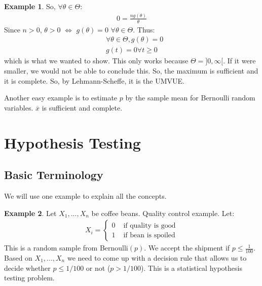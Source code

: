 \documentclass[11pt]{scrartcl}
\theoremstyle{definition}
\newtheorem{ex}{Example}
\theoremstyle{remark}
\begin{document}
{\begin{ex}
	So, $\forall \theta \in \Theta$: 
	\begin{align*}
		0 = \frac{n g(\theta)}{\theta}
	\end{align*}
	Since $n > 0$, $\theta > 0$ $\iff$ $g(\theta) = 0$ $\forall \theta \in \Theta$. Thus: 
	\begin{align*}
		& \forall \theta \in \Theta, g(\theta) = 0 \\
		& g(t) = 0 \forall t \geq 0
	\end{align*}
	which is what we wanted to show. This only works because $\Theta = ]0, \infty[$. If it were smaller, we would not be able to conclude this. So, the maximum is sufficient and it is complete. So, by Lehmann-Scheffe, it is the UMVUE. 
\end{ex}

Another easy example is to estimate $p$ by the sample mean for Bernoulli random variables. $\overline{x}$ is sufficient and complete. 


\section{Hypothesis Testing}
\subsection{Basic Terminology}
We will use one example to explain all the concepts. 

\begin{ex} 
	Let $X_1, ..., X_n$ be coffee beans. Quality control example. Let: 
	\begin{align*}
		X_i = \begin{cases}
			0 & \text{ if quality is good} \\
			1 & \text{ if bean is spoiled} 
		\end{cases}
	\end{align*}	
	This is a random sample from Bernoulli$(p)$. We accept the shipment if $p \leq \frac{1}{100}$. Based on $X_1, ..., X_n$ we need to come up with a decision rule that allows us to decide whether $p \leq 1/100$ or not ($p > 1/100$). This is a statistical hypothesis testing problem. 
\end{ex}

}
\end{document}
